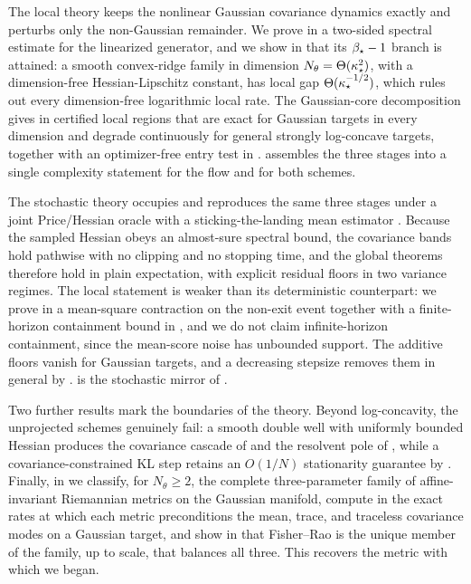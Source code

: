 The local theory keeps the nonlinear Gaussian covariance dynamics exactly and
perturbs only the non-Gaussian remainder. We prove in
 a two-sided spectral estimate for the linearized
generator, and we show in  that its $\beta_\star-1$ branch is
attained: a smooth convex-ridge family in dimension
$N_\theta = \Theta(\kappa_\star^2)$, with a dimension-free Hessian-Lipschitz
constant, has local gap $\Theta(\kappa_\star^{-1/2})$, which rules out every
dimension-free logarithmic local rate. The Gaussian-core decomposition gives in
 certified local regions that are exact for
Gaussian targets in every dimension and degrade continuously for general
strongly log-concave targets, together with an optimizer-free entry test in
.  assembles the three stages
into a single complexity statement for the flow and for both schemes.

The stochastic theory occupies  and reproduces the same
three stages under a joint Price/Hessian oracle with a sticking-the-landing
mean estimator \cite{roeder2017sticking}. Because the sampled Hessian obeys an
almost-sure spectral bound, the covariance bands hold pathwise with no clipping
and no stopping time, and the global theorems
 therefore hold in plain expectation,
with explicit residual floors in two variance regimes. The local statement is
weaker than its deterministic counterpart: we prove in
 a mean-square contraction on the
non-exit event together with a finite-horizon containment bound in
, and we do not claim infinite-horizon containment, since
the mean-score noise has unbounded support. The additive floors vanish for
Gaussian targets, and a decreasing stepsize removes them in general by
.  is the stochastic mirror of
.

Two further results mark the boundaries of the theory. Beyond log-concavity, the
unprojected schemes genuinely fail: a smooth double well with uniformly bounded
Hessian produces the covariance cascade of  and the
resolvent pole of , while a covariance-constrained KL step
retains an $O(1/N)$ stationarity guarantee by . Finally, in
 we classify, for $N_\theta \geq 2$, the complete
three-parameter family of affine-invariant Riemannian metrics on the Gaussian
manifold, compute in  the exact rates at which each metric
preconditions the mean, trace, and traceless covariance modes on a Gaussian
target, and show in  that Fisher--Rao is the unique
member of the family, up to scale, that balances all three. This recovers the
metric with which we began.

